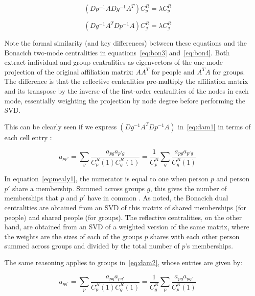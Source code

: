 \documentclass[a4paper,fleqn]{cas-sc}
\begin{document}
\begin{equation}
    \left(Dp^{-1}ADg^{-1}A^T\right)C^R_p = \lambda C^R_p
    \label{eq:dam1}
\end{equation}

\begin{equation}
    \left(Dg^{-1}A^TDp^{-1}A\right)C^R_g = \lambda C^R_g
    \label{eq:dam2}
\end{equation}

Note the formal similarity (and key differences) between these equations and the Bonacich two-mode centralities in equations~\ref{eq:bon3} and~\ref{eq:bon4}. Both extract individual and group centralities as eigenvectors of the one-mode projection of the original affiliation matrix: $AA^T$ for people and $A^TA$ for groups. The difference is that the reflective centralities pre-multiply the affiliation matrix and its transpose by the inverse of the first-order centralities of the nodes in each mode, essentially weighting the projection by node degree before performing the SVD. 

This can be clearly seen if we express $\left(Dg^{-1}A^TDp^{-1}A\right)$ in~\ref{eq:dam1} in terms of each cell entry \cite[eq. 4]{mealy2019interpreting}:

\begin{equation}
    a_{pp'} = \sum_g\frac{a_{pg}a_{p'g}}{C^R_p(1)C^R_g(1)} = 
    \frac{1}{C^R_p}\sum_g\frac{a_{pg}a_{p'g}}{C^R_g(1)}
    \label{eq:mealy1}
\end{equation}

In equation~\ref{eq:mealy1}, the numerator is equal to one when person $p$ and person $p'$ share a membership. Summed across groups $g$, this gives the number of memberships that $p$ and $p'$ have in common \citep{breiger1974duality}. As noted, the Bonacich dual centralities are obtained from an SVD of this matrix of shared memberships (for people) and shared people (for groups). The reflective centralities, on the other hand, are obtained from an SVD of a weighted version of the same matrix, where the weights are the sizes of each of the groups $p$ shares with each other person summed across groups and divided by the total number of $p$'s memberships. 

The same reasoning applies to groups in~\ref{eq:dam2}, whose entries are given by:

\begin{equation}
    a_{gg'} = \sum_p\frac{a_{pg}a_{pg'}}{C^R_p(1)C^R_g(1)} = 
    \frac{1}{C^R_g}\sum_p\frac{a_{pg}a_{pg'}}{C^R_p(1)}
    \label{eq:mealy2}
\end{equation}
\end{document}
